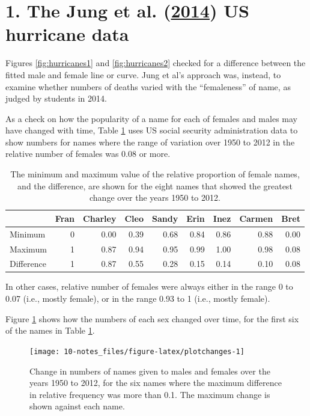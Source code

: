 \documentclass[
  10pt,
  b5paper]{book}
\begin{document}
\hypertarget{hurricanes}{%
\section*{\texorpdfstring{1. The Jung et al. (\protect\hyperlink{ref-jung2014female}{2014}) US hurricane data}{1. The Jung et al. (2014) US hurricane data}}\label{hurricanes}}

Figures \ref{fig:hurricanes1} and \ref{fig:hurricanes2} checked for a difference between the fitted male and female line or curve. Jung et al's approach was, instead, to examine whether numbers of deaths varied with the ``femaleness'' of name, as judged by students in 2014.

As a check on how the popularity of a name for each of females and males may have changed with time, Table \ref{tab:changetab} uses US social security administration data to show numbers for names where the range of variation over 1950 to 2012 in the relative number of females was 0.08 or more.

\begin{table}

\caption{\label{tab:changetab}The minimum and maximum value of the relative proportion
of female names, and the difference, are shown for the eight names
that showed the greatest change over the years 1950 to 2012.}
\centering
\begin{tabular}[t]{l|r|r|r|r|r|r|r|r}
\hline
  & Fran & Charley & Cleo & Sandy & Erin & Inez & Carmen & Bret\\
\hline
Minimum & 0 & 0.00 & 0.39 & 0.68 & 0.84 & 0.86 & 0.88 & 0.00\\
\hline
Maximum & 1 & 0.87 & 0.94 & 0.95 & 0.99 & 1.00 & 0.98 & 0.08\\
\hline
Difference & 1 & 0.87 & 0.55 & 0.28 & 0.15 & 0.14 & 0.10 & 0.08\\
\hline
\end{tabular}
\end{table}

In other cases, relative number of females were always either in the range 0 to 0.07 (i.e., mostly female), or in the range 0.93 to 1 (i.e., mostly female).

Figure \ref{fig:plotchanges} shows how the numbers of each sex changed over time, for the first six of the names in Table \ref{tab:changetab}.

\begin{figure}

{\centering \texttt{[image: 10-notes\_files/figure-latex/plotchanges-1]} 

}

\caption{Change in numbers of names given to males and females
over the years 1950 to 2012, for the six names where the 
maximum difference in relative frequency was more than 0.1.
The maximum change is shown against each name.}\label{fig:plotchanges}
\end{figure}
\end{document}
